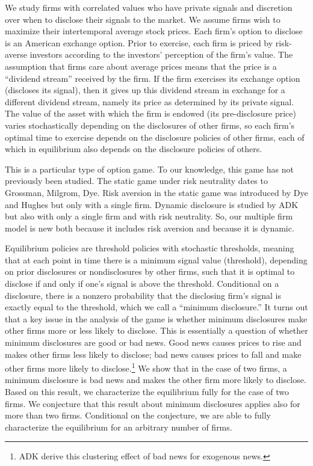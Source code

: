 \documentclass[authoryear,letterpaper,english,12pt]{elsarticle}
\theoremstyle{plain}
\numberwithin{lemma}{section}
\numberwithin{proposition}{section}
\numberwithin{equation}{section}
\numberwithin{figure}{section}
\begin{document}
We study firms with correlated values who have private signals and discretion over when to disclose their signals to the market.  We assume firms wish to maximize their intertemporal average stock prices. Each firm's option to disclose is an American exchange option.  Prior to exercise, each firm is priced by risk-averse investors according to the investors' perception of the firm's value.  The assumption that firms care about average prices means that the price is a ``dividend stream'' received by the firm.  If the firm exercises its exchange option (discloses its signal), then it gives up this dividend stream in exchange for a different dividend stream, namely its price as determined by its private signal.  The value of the asset with which the firm is endowed (its pre-disclosure price) varies stochastically depending on the disclosures of other firms, so each firm's optimal time to exercise depends on the disclosure policies of other firms, each of which in equilibrium also depends on the disclosure policies of others.

This is a particular type of option game.  To our knowledge, this game has not previously been studied.  The static game under risk neutrality dates to Grossman, Milgrom, Dye.  Risk aversion in the static game was introduced by Dye and Hughes but only with a single firm.  Dynamic disclosure is studied by ADK but also with only a single firm and with risk neutrality.  So, our multiple firm model is new both because it includes risk aversion and because it is dynamic.

Equilibrium policies are threshold policies with stochastic thresholds, meaning that at each point in time there is a minimum signal value (threshold), depending on prior disclosures or nondisclosures by other firms, such that it is optimal to disclose if and only if one's signal is above the threshold.  Conditional on a disclosure, there is a nonzero probability that the disclosing firm's signal is exactly equal to the threshold, which we call a ``minimum disclosure.''  It turns out that a key issue in the analysis of the game is whether minimum disclosures make other firms more or less likely to disclose.  This is essentially a question of whether minimum disclosures are good or bad news.  Good news causes prices to rise and makes other firms less likely to disclose; bad news causes prices to fall and make other firms more likely to disclose.\footnote{ADK derive this clustering effect of bad news for exogenous news.}  We show that in the case of two firms, a minimum disclosure is bad news and makes the other firm more likely to disclose.  Based on this result, we characterize the equilibrium fully for the case of two firms.  We conjecture that this result about minimum disclosures applies also for more than two firms.  Conditional on the conjecture, we are able to fully characterize the equilibrium for an arbitrary number of firms.
\end{document}
